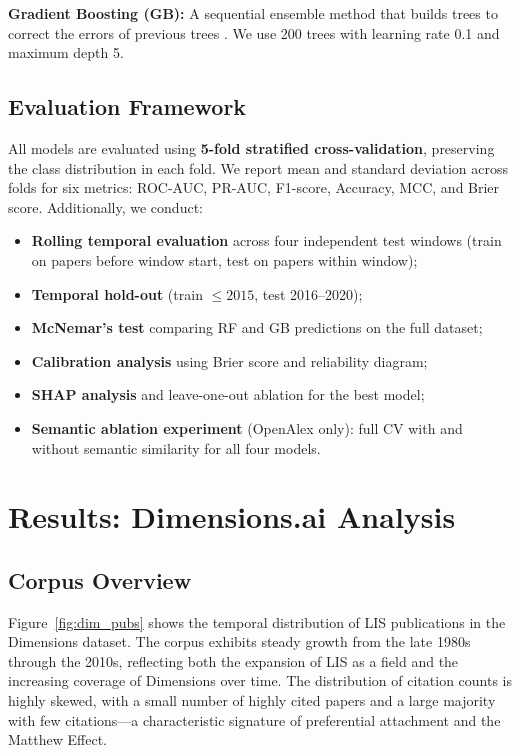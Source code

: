 \documentclass[12pt,a4paper]{article}
\begin{document}
\textbf{Gradient Boosting (GB):} A sequential ensemble method that builds trees
to correct the errors of previous trees \citep{natekin2013gradient}. We use 200
trees with learning rate 0.1 and maximum depth 5.

\subsection{Evaluation Framework}

All models are evaluated using \textbf{5-fold stratified cross-validation},
preserving the class distribution in each fold. We report mean and standard
deviation across folds for six metrics: ROC-AUC, PR-AUC, F1-score, Accuracy, MCC,
and Brier score. Additionally, we conduct:
\begin{itemize}
  \item \textbf{Rolling temporal evaluation} across four independent test windows
    (train on papers before window start, test on papers within window);
  \item \textbf{Temporal hold-out} (train $\le 2015$, test 2016--2020);
  \item \textbf{McNemar's test} comparing RF and GB predictions on the full dataset;
  \item \textbf{Calibration analysis} using Brier score and reliability diagram;
  \item \textbf{SHAP analysis} and leave-one-out ablation for the best model;
  \item \textbf{Semantic ablation experiment} (OpenAlex only): full CV with and
    without semantic similarity for all four models.
\end{itemize}

\section{Results: Dimensions.ai Analysis}
\label{sec:dim}

\subsection{Corpus Overview}

Figure~\ref{fig:dim_pubs} shows the temporal distribution of LIS publications in
the Dimensions dataset. The corpus exhibits steady growth from the late 1980s
through the 2010s, reflecting both the expansion of LIS as a field and the
increasing coverage of Dimensions over time. The distribution of citation counts
is highly skewed, with a small number of highly cited papers and a large majority
with few citations---a characteristic signature of preferential attachment and the
Matthew Effect.
\end{document}
